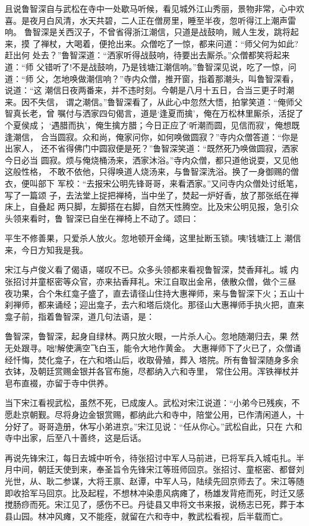 且说鲁智深自与武松在寺中一处歇马听候，看见城外江山秀丽，景物非常，心中欢
喜。是夜月白风清，水天共碧，二人正在僧房里，睡至半夜，忽听得江上潮声雷响。
鲁智深是关西汉子，不曾省得浙江潮信，只道是战鼓响，贼人生发，跳将起来，摸
了禅杖，大喝着，便抢出来。众僧吃了一惊，都来问道：“师父何为如此?赶出何
处去？”鲁智深道：“洒家听得战鼓响，待要出去厮杀。”众僧都笑将起来道：“师
父错听了!不是战鼓响，乃是钱塘江潮信响。”鲁智深见说，吃了一惊，问道：“师
父，怎地唤做潮信响？”寺内众僧，推开窗，指着那潮头，叫鲁智深看，说道：“这
潮信日夜两番来，并不违时刻。今朝是八月十五日，合当三更子时潮来。因不失信，
谓之潮信。”鲁智深看了，从此心中忽然大悟，拍掌笑道：“俺师父智真长老，曾
嘱付与洒家四句偈言，道是‘逢夏而擒’，俺在万松林里厮杀，活捉了个夏侯成；
‘遇腊而执’，俺生擒方腊；今日正应了‘听潮而圆，见信而寂’，俺想既逢潮信，
合当圆寂。众和尚，俺家问你，如何唤做圆寂？”寺内众僧答道：“你是出家人，
还不省得佛门中圆寂便是死？”鲁智深笑道：“既然死乃唤做圆寂，洒家今日必当
圆寂。烦与俺烧桶汤来，洒家沐浴。”寺内众僧，都只道他说耍，又见他这般性格，
不敢不依他，只得唤道人烧汤来，与鲁智深洗浴。换了一身御赐的僧衣，便叫部下
军校：“去报宋公明先锋哥哥，来看洒家。”又问寺内众僧处讨纸笔，写了一篇颂
子，去法堂上捉把禅椅，当中坐了，焚起一炉好香，放了那张纸在禅床上，自叠起
两只脚，左脚搭在右脚，自然天性腾空。比及宋公明见报，急引众头领来看时，鲁
智深已自坐在禅椅上不动了。颂曰：

平生不修善果，只爱杀人放火。忽地顿开金绳，这里扯断玉锁。咦!钱塘江上
潮信来，今日方知我是我。

宋江与卢俊义看了偈语，嗟叹不已。众多头领都来看视鲁智深，焚香拜礼。城
内张招讨并童枢密等众官，亦来拈香拜礼。宋江自取出金帛，俵散众僧，做个三昼
夜功果，合个朱红龛子盛了，直去请径山住持大惠禅师，来与鲁智深下火；五山十
刹禅师，都来诵经；迎出龛子，去六和塔后烧化。那径山大惠禅师手执火把，直来
龛子前，指着鲁智深，道几句法语，是：

鲁智深，鲁智深，起身自绿林。两只放火眼，一片杀人心。忽地随潮归去，果
然无处跟寻。咄!解使满空飞白玉，能令大地作黄金。
大惠禅师下了火已了，众僧诵经忏悔，焚化龛子，在六和塔山后，收取骨殖，葬入
塔院。所有鲁智深随身多余衣钵，及朝廷赏赐金银并各官布施，尽都纳入六和寺里，
常住公用。浑铁禅杖并皂布直裰，亦留于寺中供养。

当下宋江看视武松，虽然不死，已成废人。武松对宋江说道：“小弟今已残疾，不
愿赴京朝觐。尽将身边金银赏赐，都纳此六和寺中，陪堂公用，已作清闲道人，十
分好了。哥哥造册，休写小弟进京。”宋江见说：“任从你心。”武松自此，只在
六和寺中出家，后至八十善终，这是后话。

再说先锋宋江，每日去城中听令，待张招讨中军人马前进，已将军兵入城屯扎。半
月中间，朝廷天使到来，奉圣旨令先锋宋江等班师回京。张招讨、童枢密、都督刘
光世，从、耿二参谋，大将王禀、赵谭，中军人马，陆续先回京师去了。宋江等随
即收拾军马回京。比及起程，不想林冲染患风病瘫了，杨雄发背疮而死，时迁又感
搅肠痧而死。宋江见了，感伤不已。丹徒县又申将文书来报，说杨志已死，葬于本
县山园。林冲风瘫，又不能痊，就留在六和寺中，教武松看视，后半载而亡。

